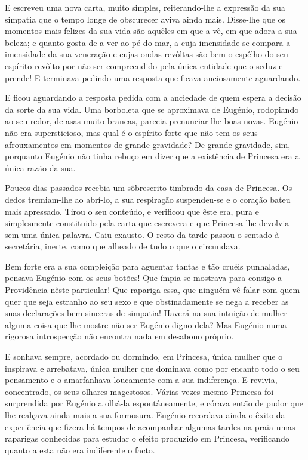 \documentclass[9pt]{article}
\begin{document}
E escreveu uma nova carta, muito simples, reiterando-\-lhe a ex\-pres\-são da sua simpatia que o tempo longe de obscurecer aviva ainda mais.
Disse-\-lhe que os momentos mais felizes da sua vida são a\-quê\-les em
que a vê, em que adora a sua beleza; e quanto gosta de a ver ao pé do
mar, a cuja imensidade se compara a imensidade da sua venera\-ção e cujas ondas revôltas são bem o espê\-lho do seu espírito revôlto por não
ser compreendido pela única entidade que o seduz e prende! E terminava pedindo uma resposta que fi\-cava anciosamente aguardando.

E ficou aguardando a resposta pedida com a anciedade de quem espera a decisão da sorte da sua vida. Uma borboleta que se aproximava
de Eugé\-nio, rodopiando ao seu redor, de asas muito brancas, parecia prenunciar-\-lhe boas novas. Eugé\-nio não era supersticioso, mas qual é o
espírito forte que não tem os seus afrouxamentos em momentos de gran\-de
gravidade? De gran\-de gravidade, sim, porquanto Eugé\-nio não tinha rebuço
em dizer que a exis\-tên\-cia de Princesa era a única razão da sua.

Poucos dias passados recebia um sôbrescrito timbrado da casa de
Princesa. Os dedos tremiam-\-lhe ao abrí-lo, a sua respira\-ção suspendeu-se e o cora\-ção bateu mais apressado. Tirou o seu conteúdo, e verificou que êste era, pura e simplesmente constituido pela carta que escrevera e que
Princesa lhe devolvia sem uma única palavra. Caiu exausto. O resto
da tarde passou-o sentado à secretária, inerte, como que a\-lheado de tudo o que o circundava.

Bem forte era a sua complei\-ção para aguentar tantas e tão cruéis
punhaladas, pensava Eugé\-nio com os seus botões! Que ímpia se mostrava para
consigo a Providên\-cia nês\-te particular! Que rapariga essa, que nin\-guém
vê falar com quem quer que seja estranho ao seu sexo e que obstinadamente se nega a receber as suas declara\-ções bem sinceras de simpatia!
Haverá na sua intui\-ção de mu\-lher alguma coisa que lhe mostre não ser
Eugé\-nio digno dela? Mas Eugé\-nio numa rigorosa introspec\-ção não encontra nada em desabono próprio.

E sonhava sempre, acordado ou dormindo, em Princesa, única mu\-lher
que o inspirava e arrebatava, única mu\-lher que dominava como por encanto todo o seu pensamento e o amarfanhava loucamente com a sua indiferença.
E revivia, concentrado, os seus o\-lhares magestosos. Várias vezes mesmo
Princesa foi surprendida por Eugé\-nio a o\-lhá-la espontâneamente, e córava então de pudor que lhe realçava ainda mais a sua formosura. Eugé\-nio recordava
ainda o êxito da experiência que fizera há tempos de acompanhar algumas tardes na praia umas raparigas conhecidas para estudar o efeito produzido em
Princesa, verifi\-cando quanto a esta não era indiferente o facto.
\end{document}
